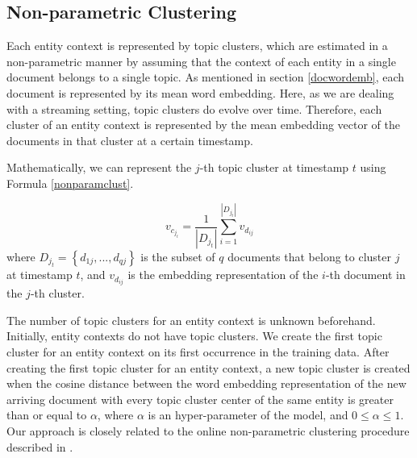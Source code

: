 \documentclass{article}
\begin{document}



\subsection{Non-parametric Clustering}
\label{non}

Each entity context is represented by topic clusters, which are estimated in a non-parametric manner by assuming that the context of each entity in a single document belongs to a single topic. As mentioned in section \ref{docwordemb}, each document is represented by its mean word embedding. Here, as we are dealing with a streaming setting, topic clusters do evolve over time. Therefore, each cluster of an entity context is represented by the mean embedding vector of the documents in that cluster at a certain timestamp.

Mathematically, we can represent the $j$-th topic cluster at timestamp $t$ using Formula \ref{nonparamclust}.

\begin{equation}
\label{nonparamclust}
v_{c_{j_t}} = \frac{1}{|D_{j_t}|} \sum_{i=1}^{|D_{j_t}|}{v_{d_{ij}}}
\end{equation}
where $D_{j_t} = \left\{ {d_{1j}, ..., d_{qj}} \right\}$ is the subset of $q$ documents that belong to cluster $j$ at timestamp $t$, and $v_{d_{ij}}$ is the embedding representation of the $i$-th document in the $j$-th cluster.

The number of topic clusters for an entity context is unknown beforehand. Initially, entity contexts do not have topic clusters. We create the first topic cluster for an entity context on its first occurrence in the training data. After creating the first topic cluster for an entity context, a new topic cluster is created when the cosine distance between the word embedding representation of the new arriving document with every topic cluster center of the same entity is greater than or equal to $\alpha$, where $\alpha$ is an hyper-parameter of the model, and $0 \leq \alpha \leq 1$. Our approach is closely related to the online non-parametric clustering procedure described in \citet{Arvind14}.
\end{document}
